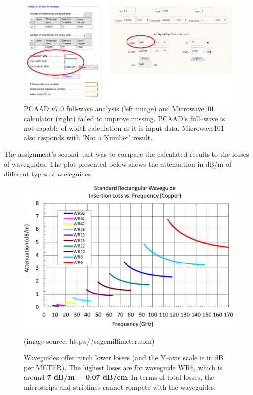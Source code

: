 \documentclass[eng,printmode]{mgr}
\begin{document}
\begin{figure}
	\centering
	\includegraphics[width=0.7\linewidth]{microwave-fail}
	\caption{PCAAD v7.0 full-wave analysis (left image) and Microwave101 calculator (right) failed to improve missing. PCAAD's full--wave is not capable of width calculation as it is input data. Microwave101 also responds with "Not a Number" result.}
	\label{fig:microwave-fail}
\end{figure}
The assignment's second part was to compare the calculated results to the losses of waveguides. The plot presented below shows the attenuation in dB/m of different types of waveguides.
\begin{figure}[h]
	\centering
	\includegraphics[width=0.6\linewidth]{waveguides}
	\label{fig:waveguides}
	\caption{Waveguides offer much lower losses (and the Y--axis scale is in dB per METER).
	The highest loses are for waveguide WR6, which is around \textbf{7 dB/m = 0.07 dB/cm}.
	In terms of total losses, the microstrips and striplines cannot compete with the waveguides.}
	(image source: https://sagemillimeter.com)
\end{figure}
\end{document}
